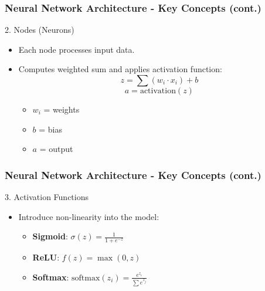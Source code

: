 \documentclass[aspectratio=169]{beamer}
\begin{document}
\begin{frame}[fragile]
    \frametitle{Neural Network Architecture - Key Concepts (cont.)}
    \begin{block}{2. Nodes (Neurons)}
        \begin{itemize}
            \item Each node processes input data.
            \item Computes weighted sum and applies activation function:
            \begin{equation}
                z = \sum (w_i \cdot x_i) + b
            \end{equation}
            \begin{equation}
                a = \text{activation}(z)
            \end{equation}
            \begin{itemize}
                \item \( w_i \) = weights
                \item \( b \) = bias
                \item \( a \) = output
            \end{itemize}
        \end{itemize}
    \end{block}
\end{frame}

\begin{frame}[fragile]
    \frametitle{Neural Network Architecture - Key Concepts (cont.)}
    \begin{block}{3. Activation Functions}
        \begin{itemize}
            \item Introduce non-linearity into the model:
                \begin{itemize}
                    \item \textbf{Sigmoid}: \( \sigma(z) = \frac{1}{1 + e^{-z}} \)
                    \item \textbf{ReLU}: \( f(z) = \max(0, z) \)
                    \item \textbf{Softmax}: \( \text{softmax}(z_i) = \frac{e^{z_i}}{\sum e^{z_j}} \)
                \end{itemize}
        \end{itemize}
    \end{block}
\end{frame}
\end{document}
